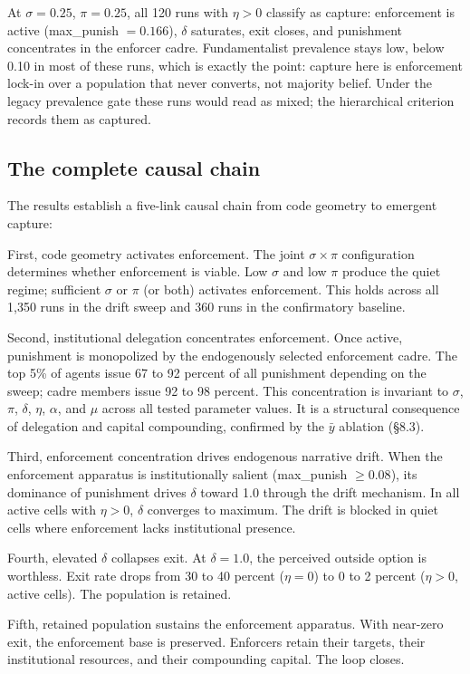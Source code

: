 \documentclass[12pt]{article}
\begin{document}
At $\sigma = 0.25$, $\pi = 0.25$, all 120 runs with $\eta > 0$ classify as capture: enforcement is active (max\_punish $= 0.166$), $\delta$ saturates, exit closes, and punishment concentrates in the enforcer cadre. Fundamentalist prevalence stays low, below 0.10 in most of these runs, which is exactly the point: capture here is enforcement lock-in over a population that never converts, not majority belief. Under the legacy prevalence gate these runs would read as mixed; the hierarchical criterion records them as captured.

\subsection{The complete causal chain}

The results establish a five-link causal chain from code geometry to emergent capture:

First, code geometry activates enforcement. The joint $\sigma \times \pi$ configuration determines whether enforcement is viable. Low $\sigma$ and low $\pi$ produce the quiet regime; sufficient $\sigma$ or $\pi$ (or both) activates enforcement. This holds across all 1,350 runs in the drift sweep and 360 runs in the confirmatory baseline.

Second, institutional delegation concentrates enforcement. Once active, punishment is monopolized by the endogenously selected enforcement cadre. The top 5\% of agents issue 67 to 92 percent of all punishment depending on the sweep; cadre members issue 92 to 98 percent. This concentration is invariant to $\sigma$, $\pi$, $\delta$, $\eta$, $\alpha$, and $\mu$ across all tested parameter values. It is a structural consequence of delegation and capital compounding, confirmed by the $\bar{y}$ ablation (\S8.3).

Third, enforcement concentration drives endogenous narrative drift. When the enforcement apparatus is institutionally salient (max\_punish $\geq 0.08$), its dominance of punishment drives $\delta$ toward 1.0 through the drift mechanism. In all active cells with $\eta > 0$, $\delta$ converges to maximum. The drift is blocked in quiet cells where enforcement lacks institutional presence.

Fourth, elevated $\delta$ collapses exit. At $\delta = 1.0$, the perceived outside option is worthless. Exit rate drops from 30 to 40 percent ($\eta = 0$) to 0 to 2 percent ($\eta > 0$, active cells). The population is retained.

Fifth, retained population sustains the enforcement apparatus. With near-zero exit, the enforcement base is preserved. Enforcers retain their targets, their institutional resources, and their compounding capital. The loop closes.
\end{document}
